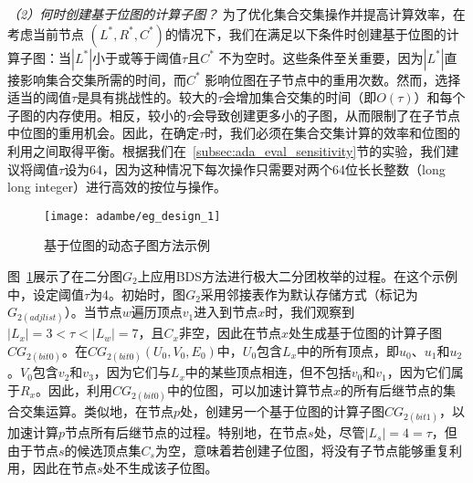 \textit{（2）何时创建基于位图的计算子图？ }为了优化集合交集操作并提高计算效率，在考虑当前节点 $(L^*, R^*, C^*)$的情况下，我们在满足以下条件时创建基于位图的计算子图：当$|L^*|$小于或等于阈值$\tau$且$C^*$ 不为空时。这些条件至关重要，因为$|L^*|$直接影响集合交集所需的时间，而$C^*$ 影响位图在子节点中的重用次数。然而，选择适当的阈值$\tau$是具有挑战性的。较大的$\tau$会增加集合交集的时间（即$O(\tau)$）和每个子图的内存使用。相反，较小的$\tau$会导致创建更多小的子图，从而限制了在子节点中位图的重用机会。因此，在确定$\tau$时，我们必须在集合交集计算的效率和位图的利用之间取得平衡。根据我们在~\ref{subsec:ada_eval_sensitivity}节的实验，我们建议将阈值$\tau$设为64，因为这种情况下每次操作只需要对两个64位长长整数（long long integer）进行高效的按位与操作。



\begin{figure} [H]
	\centering
   \vspace{0.2in}
	\texttt{[image: adambe/eg\_design\_1]}
	\caption{基于位图的动态子图方法示例}

	\label{fig:ada_design1}
\end{figure}



\begin{example}
	
	图~\ref{fig:ada_design1}展示了在二分图$G_2$上应用BDS方法进行极大二分团枚举的过程。在这个示例中，设定阈值$\tau$为4。初始时，图$G_2$采用邻接表作为默认存储方式（标记为$G_{2 (adjlist)}$）。当节点$w$遍历顶点$v_1$进入到节点$x$时，我们观察到$|L_x| = 3 < \tau < |L_w| = 7$，且$C_x$非空，因此在节点$x$处生成基于位图的计算子图$CG_{2 (bit0)}$。在$CG_{2 (bit0)}(U_0, V_0, E_0)$中，$U_0$包含$L_x$中的所有顶点，即$u_0$、$u_1$和$u_2$。$V_0$包含$v_2$和$v_3$，因为它们与$L_x$中的某些顶点相连，但不包括$v_0$和$v_1$，因为它们属于$R_x$。因此，利用$CG_{2 (bit0)}$中的位图，可以加速计算节点$x$的所有后继节点的集合交集运算。类似地，在节点$p$处，创建另一个基于位图的计算子图$CG_{2 (bit1)}$，以加速计算$p$节点所有后继节点的过程。特别地，在节点$s$处，尽管$|L_s| = 4 = \tau$，但由于节点$s$的候选顶点集$C_s$为空，意味着若创建子位图，将没有子节点能够重复利用，因此在节点$s$处不生成该子位图。
  
\end{example}

